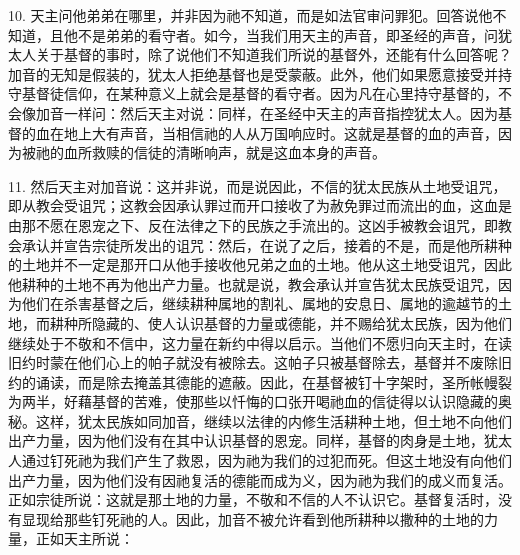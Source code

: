 10. 天主问他弟弟在哪里，并非因为祂不知道，而是如法官审问罪犯。回答说他不知道，且他不是弟弟的看守者。如今，当我们用天主的声音，即圣经的声音，问犹太人关于基督的事时，除了说他们不知道我们所说的基督外，还能有什么回答呢？加音的无知是假装的，犹太人拒绝基督也是受蒙蔽。此外，他们如果愿意接受并持守基督徒信仰，在某种意义上就会是基督的看守者。因为凡在心里持守基督的，不会像加音一样问：然后天主对说：同样，在圣经中天主的声音指控犹太人。因为基督的血在地上大有声音，当相信祂的人从万国响应时。这就是基督的血的声音，因为被祂的血所救赎的信徒的清晰响声，就是这血本身的声音。\par

11. 然后天主对加音说：这并非说，而是说因此，不信的犹太民族从土地受诅咒，即从教会受诅咒；这教会因承认罪过而开口接收了为赦免罪过而流出的血，这血是由那不愿在恩宠之下、反在法律之下的民族之手流出的。这凶手被教会诅咒，即教会承认并宣告宗徒所发出的诅咒：然后，在说了之后，接着的不是，而是他所耕种的土地并不一定是那开口从他手接收他兄弟之血的土地。他从这土地受诅咒，因此他耕种的土地不再为他出产力量。也就是说，教会承认并宣告犹太民族受诅咒，因为他们在杀害基督之后，继续耕种属地的割礼、属地的安息日、属地的逾越节的土地，而耕种所隐藏的、使人认识基督的力量或德能，并不赐给犹太民族，因为他们继续处于不敬和不信中，这力量在新约中得以启示。当他们不愿归向天主时，在读旧约时蒙在他们心上的帕子就没有被除去。这帕子只被基督除去，基督并不废除旧约的诵读，而是除去掩盖其德能的遮蔽。因此，在基督被钉十字架时，圣所帐幔裂为两半，好藉基督的苦难，使那些以忏悔的口张开喝祂血的信徒得以认识隐藏的奥秘。这样，犹太民族如同加音，继续以法律的内修生活耕种土地，但土地不向他们出产力量，因为他们没有在其中认识基督的恩宠。同样，基督的肉身是土地，犹太人通过钉死祂为我们产生了救恩，因为祂为我们的过犯而死。但这土地没有向他们出产力量，因为他们没有因祂复活的德能而成为义，因为祂为我们的成义而复活。正如宗徒所说：这就是那土地的力量，不敬和不信的人不认识它。基督复活时，没有显现给那些钉死祂的人。因此，加音不被允许看到他所耕种以撒种的土地的力量，正如天主所说：\par

